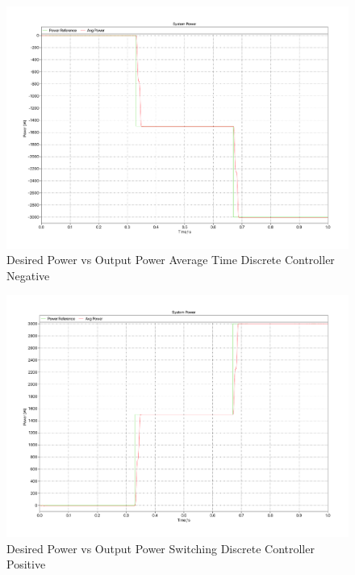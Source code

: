 \documentclass[12pt]{article}
\begin{document}
\begin{figure}[ht]
    \centering{}
    \includegraphics[width=\textwidth, height=0.4\textheight, keepaspectratio]{img/Average Time Z-C Power Negative.pdf}
    \caption{Desired Power vs Output Power Average Time Discrete Controller Negative}
    \label{fig:avg-time-z-c-power-negative}
\end{figure}

\begin{figure}[ht]
    \centering{}
    \includegraphics[width=\textwidth, height=0.4\textheight, keepaspectratio]{img/Switching Z-C Power Positive.pdf}
    \caption{Desired Power vs Output Power Switching Discrete Controller Positive}
    \label{fig:switching-z-c-power-positive}
\end{figure}
\end{document}
